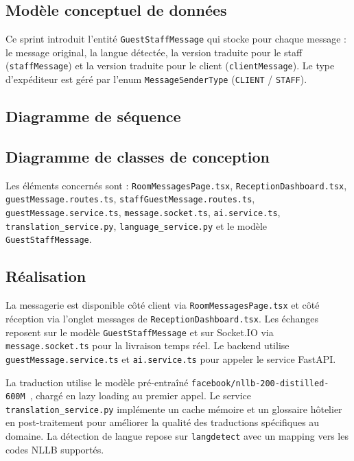 \subsection{Modèle conceptuel de données}
Ce sprint introduit l'entité \texttt{GuestStaffMessage} qui stocke pour chaque message : le message original, la langue détectée, la version traduite pour le staff (\texttt{staffMessage}) et la version traduite pour le client (\texttt{clientMessage}). Le type d'expéditeur est géré par l'enum \texttt{MessageSenderType} (\texttt{CLIENT} / \texttt{STAFF}).


\subsection{Diagramme de séquence}

\subsection{Diagramme de classes de conception}
Les éléments concernés sont : \texttt{RoomMessagesPage.tsx}, \texttt{ReceptionDashboard.tsx}, \texttt{guestMessage.routes.ts}, \texttt{staffGuestMessage.routes.ts}, \texttt{guestMessage.service.ts}, \texttt{message.socket.ts}, \texttt{ai.service.ts}, \texttt{translation\_service.py}, \texttt{language\_service.py} et le modèle \texttt{GuestStaffMessage}.


\subsection{Réalisation}
La messagerie est disponible côté client via \texttt{RoomMessagesPage.tsx} et côté réception via l'onglet messages de \texttt{ReceptionDashboard.tsx}. Les échanges reposent sur le modèle \texttt{GuestStaffMessage} et sur Socket.IO via \texttt{message.socket.ts} pour la livraison temps réel. Le backend utilise \texttt{guestMessage.service.ts} et \texttt{ai.service.ts} pour appeler le service FastAPI.

La traduction utilise le modèle pré-entraîné \texttt{facebook/nllb-200-distilled-600M}~\cite{nllb200}, chargé en lazy loading au premier appel. Le service \texttt{translation\_service.py} implémente un cache mémoire et un glossaire hôtelier en post-traitement pour améliorer la qualité des traductions spécifiques au domaine. La détection de langue repose sur \texttt{langdetect} avec un mapping vers les codes NLLB supportés.

